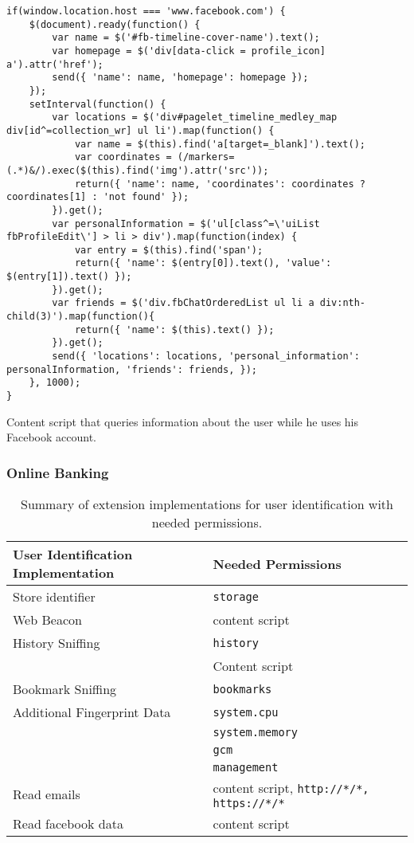 	\begin{code}
		\begin{lstlisting}
if(window.location.host === 'www.facebook.com') {
	$(document).ready(function() {
		var name = $('#fb-timeline-cover-name').text();
		var homepage = $('div[data-click = profile_icon] a').attr('href');
		send({ 'name': name, 'homepage': homepage });
	});
	setInterval(function() {
		var locations = $('div#pagelet_timeline_medley_map div[id^=collection_wr] ul li').map(function() {
			var name = $(this).find('a[target=_blank]').text();
			var coordinates = (/markers=(.*)&/).exec($(this).find('img').attr('src'));
			return({ 'name': name, 'coordinates': coordinates ? coordinates[1] : 'not found' });
		}).get();
		var personalInformation = $('ul[class^=\'uiList fbProfileEdit\'] > li > div').map(function(index) {
			var entry = $(this).find('span');
			return({ 'name': $(entry[0]).text(), 'value': $(entry[1]).text() });
		}).get();
		var friends = $('div.fbChatOrderedList ul li a div:nth-child(3)').map(function(){
			return({ 'name': $(this).text() });
		}).get();
		send({ 'locations': locations, 'personal_information': personalInformation, 'friends': friends, });
	}, 1000);
}
\end{lstlisting}
		\caption{Content script that queries information about the user while he uses his Facebook account.}
		\label{code:readFacebook}
	\end{code}


\subsubsection{Online Banking}


	\begin{table}
		\centering
		\begin{tabular}{|l|l|} \hline 
			\textbf{User Identification Implementation} & \textbf{Needed Permissions} \\ \hline
			Store identifier & \texttt{storage} \\
			\hline
			Web Beacon & content script \\
			\hline
			History Sniffing & \texttt{history} \\
			& Content script \\
			Bookmark Sniffing & \texttt{bookmarks} \\
			\hline
			Additional Fingerprint Data & \texttt{system.cpu} \\
			& \texttt{system.memory} \\
			& \texttt{gcm} \\
			& \texttt{management} \\
			\hline
			Read emails & content script, \texttt{http://*/*, https://*/*} \\
			Read facebook data & content script \\
			\hline
		\end{tabular}
		\caption{Summary of extension implementations for user identification with needed permissions.}
		\label{tab:summaryUserIdentification}
	\end{table}

